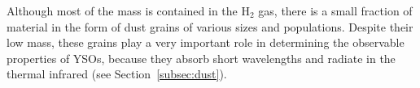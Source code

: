 Although most of the mass is contained in the $\textrm{H}_2$ gas, there is a small fraction of material in the form of dust grains of various sizes and populations. Despite their low mass, these grains play a very important role in determining the observable properties of YSOs, because they absorb short wavelengths and radiate in the thermal infrared (see Section~\ref{subsec:dust}). 






